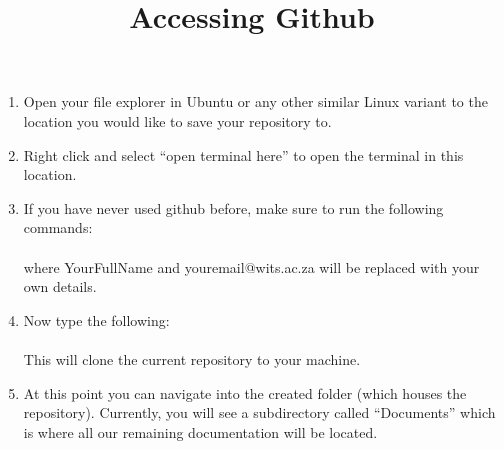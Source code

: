 \documentclass[12pt]{article}
\title{Accessing Github}
\begin{document}
\date{\vspace{-5ex}}
\maketitle

\begin{enumerate}
  \item Open your file explorer in Ubuntu or any other similar Linux variant to the location        you would like to save your repository to.
  \item Right click and select ``open terminal here'' to open the terminal in this location.
  \item If you have never used github before, make sure to run the following commands: \\
\\
  where Your\textunderscore Full\textunderscore Name and youremail@wits.ac.za will be replaced with your own details.
  \item Now type the following: \\
  \\
  This will clone the current repository to your machine.
  
  \item At this point you can navigate into the created folder (which houses the repository). Currently, you will see a subdirectory called ``Documents'' which is where all our remaining documentation will be located.

\end{enumerate}
\end{document}
